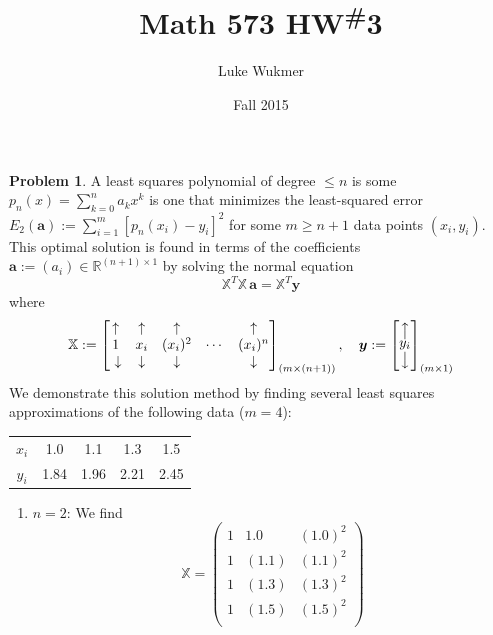 \documentclass[10pt]{article}
\theoremstyle{plain}
\theoremstyle{definition}
\newtheorem{prob}{Problem}
\providecommand{\R}{\mathbb{R}}%
\numberwithin{equation}{section}
\newcommand*\mcol[1]{\overset{\big\uparrow}{\underset{\big\downarrow}{#1}}}
\begin{document}
\title{Math 573 HW\textsuperscript{\#}3}
\author{Luke Wukmer}
\date{Fall 2015}
\maketitle \thispagestyle{empty} %

\begin{prob}
    A least squares polynomial of degree $\leq n$ is some $p_n(x) = \sum_{k=0}^n a_k x^k$
    is one that minimizes the least-squared error
    $E_2(\bm{a}) := \sum_{i=1}^{m}\left[p_n(x_i) - y_i\right]^2$
    for some $m \geq n+1$ data points $(x_i, y_i)$.  
    This optimal solution is found in terms of the coefficients
    $\bm{a} := (a_i) \in \R^{(n+1) \times 1}$ by solving the normal equation
    \[      
            \mathbb{X}^T\mathbb{X}\, \bm{a} = \mathbb{X}^T \bm{y}
    \]
    where \[
            \mathbb{X} := \begin{bmatrix}
                \uparrow & \uparrow & \uparrow &    & \uparrow \\
            1       & x_i & (x_i)^2 & \cdots & (x_i)^n      \\\
            \downarrow & \downarrow & \downarrow &  & \downarrow 
            \end{bmatrix}_{(m \times (n+1))} , \quad
        \bm{y} := \begin{bmatrix}\mcol{y_i}\end{bmatrix}_{(m \times 1)}
\]
We demonstrate this solution method by finding several least squares approximations of the
following data ($m=4$):
    \begin{center}
        \begin{tabular}{c c c c c}
        \hline
        $x_i$ & 1.0 & 1.1 & 1.3 & 1.5 \\
        $y_i$ & 1.84 & 1.96 & 2.21 & 2.45\\
        \hline
    \end{tabular} 
    \end{center}
\begin{enumerate}[\bfseries(a)]
\item $n=2$: We find 
    \[
            \mathbb{X} = \begin{pmatrix}
                1 & 1.0 & (1.0)^2 \\
                1 & (1.1) & (1.1)^2 \\
                1 & (1.3) & (1.3)^2 \\
                1 & (1.5) & (1.5)^2 \\

\end{pmatrix}\]
\end{enumerate}
\end{prob}
\end{document}
